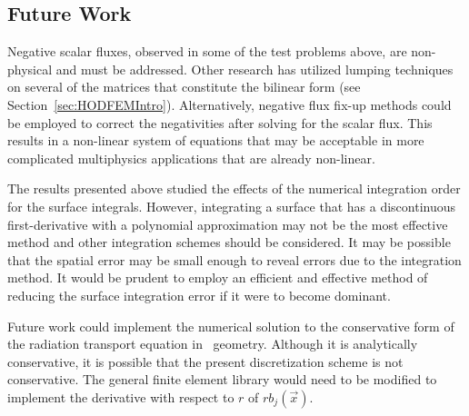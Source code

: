 \documentclass[12pt]{article}
\begin{document}
\subsection{Future Work}
\label{sec:FutureWork}
Negative scalar fluxes, observed in some of the test problems above, are non-physical and must be addressed. Other research has utilized lumping techniques on several of the matrices that constitute the bilinear form (see Section~\ref{sec:HODFEMIntro}). Alternatively, negative flux fix-up methods could be employed to correct the negativities after solving for the scalar flux. This results in a non-linear system of equations that may be acceptable in more complicated multiphysics applications that are already non-linear.

The results presented above studied the effects of the numerical integration order for the surface integrals. However, integrating a surface that has a discontinuous first-derivative with a polynomial approximation may not be the most effective method and other integration schemes should be considered. It may be possible that the spatial error may be small enough to reveal errors due to the integration method. It would be prudent to employ an efficient and effective method of reducing the surface integration error if it were to become dominant.

Future work could implement the numerical solution to the conservative form of the radiation transport equation in \RZ\ geometry. Although it is analytically conservative, it is possible that the present discretization scheme is not conservative. The general finite element library would need to be modified to implement the derivative with respect to $r$ of $r b_j(\vec{x})$.

\begin{comment}
It is common for the solution to the thermal radiation transport equation to be averaged over each mesh zone to be used in the energy balance equation for hydrodynamics calculations. We could also consider cell average spherical symmetry preservation. Also for the spherical symmetry manufactured solution, we would like to develop other manufactured solutions that have simpler manufactured source terms near the origin. The source term that we used was sufficient for $(r,z)$ coordinates further from the origin, but the finite element approximated source term was not close enough to the analytical source near the origin to maintain symmetry. Lastly, the mesh used for the axisymmetry calculations was made entirely of quadrilaterals. That is, even the innermost zones were quadrilaterals with one vertex having a very oblique angle (nearly 180 degrees). We need to modify MFEM to handle mixed element types.
\end{comment}
\end{document}
